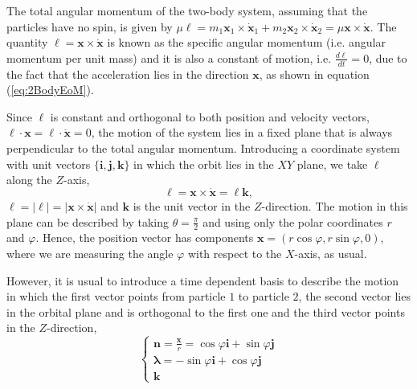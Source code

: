 The total angular momentum of the two-body system, assuming that the particles have no spin, is given by $\mu \boldsymbol{\ell} = m_1 \textbf{x}_1 \times \dot{ \textbf{x} }_1 + m_2 \textbf{x}_2 \times \dot{ \textbf{x} }_2 = \mu \textbf{x} \times \dot{ \textbf{x} }$. The quantity $\boldsymbol{\ell} = \textbf{x} \times \dot{\textbf{x}}$ is known as the specific angular momentum (i.e. angular momentum per unit mass) and it is also a constant of motion, i.e. $\frac{d\boldsymbol{\ell}}{dt}=0$, due to the fact that the acceleration lies in the direction $\textbf{x}$, as shown in equation (\ref{eq:2BodyEoM}). 

Since $\boldsymbol{\ell}$ is constant and orthogonal to both position and velocity vectors, $\boldsymbol{\ell}\cdot \textbf{x}  = \boldsymbol{\ell} \cdot \dot{\textbf{x}} = 0$, the motion of the system lies in a fixed plane that is always perpendicular to the total angular momentum. Introducing a coordinate system with unit vectors $\{ \textbf{i}, \textbf{j}, \textbf{k} \}$  in which the orbit lies in the $XY$ plane, we take $\boldsymbol{\ell}$ along the $Z$-axis,
\begin{equation}
\boldsymbol{\ell} = \textbf{x} \times \dot{ \textbf{x}} = \ell \textbf{k}, \label{eq:2BodyAngularMomentum}
\end{equation}
$\ell = \left| \boldsymbol{\ell} \right| = \left| \textbf{x} \times \dot{\textbf{x}} \right|$ and $\textbf{k}$ is the unit vector in the $Z$-direction. The motion in this plane can be described by taking $\theta=\frac{\pi}{2}$ and using only the polar coordinates $r$ and $\varphi$. Hence, the position vector has components $\textbf{x} = (r \cos \varphi , r \sin \varphi , 0)$, where we are measuring the angle $\varphi$ with respect to the $X$-axis, as usual. 

However, it is usual to introduce a time dependent basis to describe the motion in which the first vector points from particle $1$ to particle $2$, the second vector lies in the orbital plane and is orthogonal to the first one and the third vector points in the $Z$-direction,
\begin{equation}
\begin{cases}
\textbf{n} = \frac{\textbf{x}}{r} =\cos \varphi \textbf{i} + \sin \varphi \textbf{j}   \\
\boldsymbol{\lambda} = -\sin \varphi \textbf{i} + \cos \varphi \textbf{j} \\
\textbf{k} 
\end{cases} \label{eq:2BodyTimeDependentBasis}
\end{equation}

